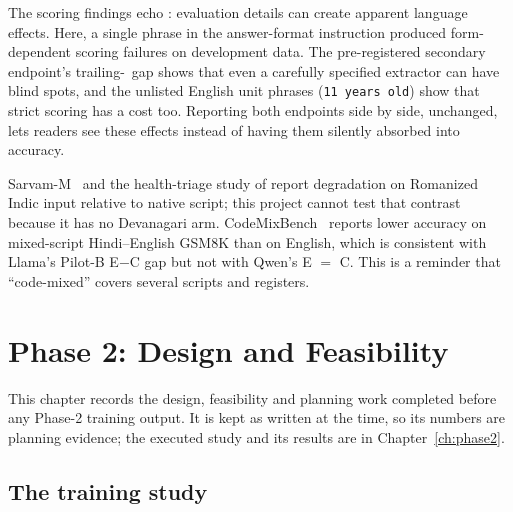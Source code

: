 \documentclass[12pt,a4paper,oneside]{report}
\renewcommand{\_}{\oldunderscore\allowbreak}
\newcommand{\rs}{\rupee}
\begin{document}
The scoring findings echo \citet{peter-etal-2026-mind}: evaluation details can create apparent language effects. Here, a single phrase in the answer-format instruction produced form-dependent scoring failures on development data. The pre-registered secondary endpoint's trailing-\rs\ gap shows that even a carefully specified extractor can have blind spots, and the unlisted English unit phrases (\texttt{11 years old}) show that strict scoring has a cost too. Reporting both endpoints side by side, unchanged, lets readers see these effects instead of having them silently absorbed into accuracy.

Sarvam-M~\citep{sarvam-2025-sarvamm} and the health-triage study of \citet{khullar-etal-2026-script} report degradation on Romanized Indic input relative to native script; this project cannot test that contrast because it has no Devanagari arm. CodeMixBench~\citep{yang-chai-2025-codemixbench} reports lower accuracy on mixed-script Hindi--English GSM8K than on English, which is consistent with Llama's Pilot-B E$-$C gap but not with Qwen's E $=$ C. This is a reminder that ``code-mixed'' covers several scripts and registers.

\chapter{Phase 2: Design and Feasibility}
\label{ch:phase2plan}

This chapter records the design, feasibility and planning work completed before any Phase-2 training output. It is kept as written at the time, so its numbers are planning evidence; the executed study and its results are in Chapter~\ref{ch:phase2}.

\section{The training study}
\end{document}
